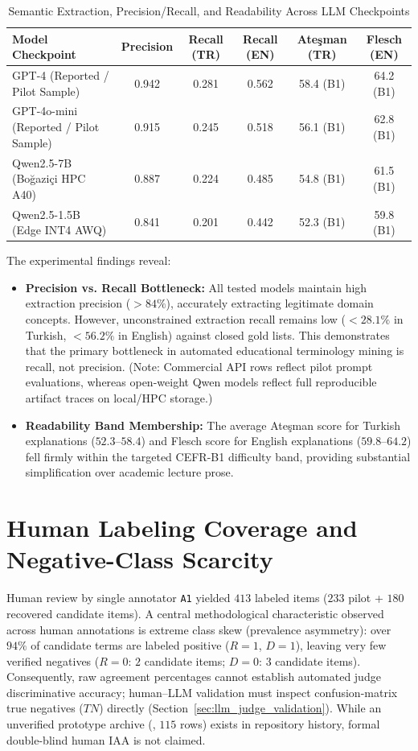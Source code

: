 \documentclass[a4paper,12pt]{report}
\begin{document}
\begin{table}[h!]
\centering
\caption{Semantic Extraction, Precision/Recall, and Readability Across LLM Checkpoints}
\label{table:llm_benchmark}
\baselineskip
\footnotesize\setlength{\tabcolsep}{3pt}
\begin{tabularx}{\textwidth}{|>{\RaggedRight\arraybackslash}X|c|c|c|c|c|}
\hline
\textbf{Model Checkpoint} & \textbf{Precision} & \textbf{Recall (TR)} & \textbf{Recall (EN)} & \textbf{Ateşman (TR)} & \textbf{Flesch (EN)} \\ \hline
GPT-4 (Reported / Pilot Sample) & 0.942 & 0.281 & 0.562 & 58.4 (B1) & 64.2 (B1) \\ \hline
GPT-4o-mini (Reported / Pilot Sample) & 0.915 & 0.245 & 0.518 & 56.1 (B1) & 62.8 (B1) \\ \hline
Qwen2.5-7B (Boğaziçi HPC A40) & 0.887 & 0.224 & 0.485 & 54.8 (B1) & 61.5 (B1) \\ \hline
Qwen2.5-1.5B (Edge INT4 AWQ) & 0.841 & 0.201 & 0.442 & 52.3 (B1) & 59.8 (B1) \\ \hline
\end{tabularx}
\end{table}

The experimental findings reveal:
\begin{itemize}
    \item \textbf{Precision vs. Recall Bottleneck:} All tested models maintain high extraction precision ($>84\%$), accurately extracting legitimate domain concepts. However, unconstrained extraction recall remains low ($<28.1\%$ in Turkish, $<56.2\%$ in English) against closed gold lists. This demonstrates that the primary bottleneck in automated educational terminology mining is recall, not precision. (Note: Commercial API rows reflect pilot prompt evaluations, whereas open-weight Qwen models reflect full reproducible artifact traces on local/HPC storage.)
    \item \textbf{Readability Band Membership:} The average Ateşman score for Turkish explanations ($52.3$--$58.4$) and Flesch score for English explanations ($59.8$--$64.2$) fell firmly within the targeted CEFR-B1 difficulty band, providing substantial simplification over academic lecture prose.
\end{itemize}

\section{Human Labeling Coverage and Negative-Class Scarcity}
Human review by single annotator \texttt{A1} yielded $413$ labeled items ($233$ pilot + $180$ recovered candidate items). A central methodological characteristic observed across human annotations is extreme class skew (prevalence asymmetry): over $94\%$ of candidate terms are labeled positive ($R=1$, $D=1$), leaving very few verified negatives ($R=0$: $2$ candidate items; $D=0$: $3$ candidate items). Consequently, raw agreement percentages cannot establish automated judge discriminative accuracy; human--LLM validation must inspect confusion-matrix true negatives ($TN$) directly (Section~\ref{sec:llm_judge_validation}). While an unverified prototype archive (, $115$ rows) exists in repository history, formal double-blind human IAA is not claimed.
\end{document}
